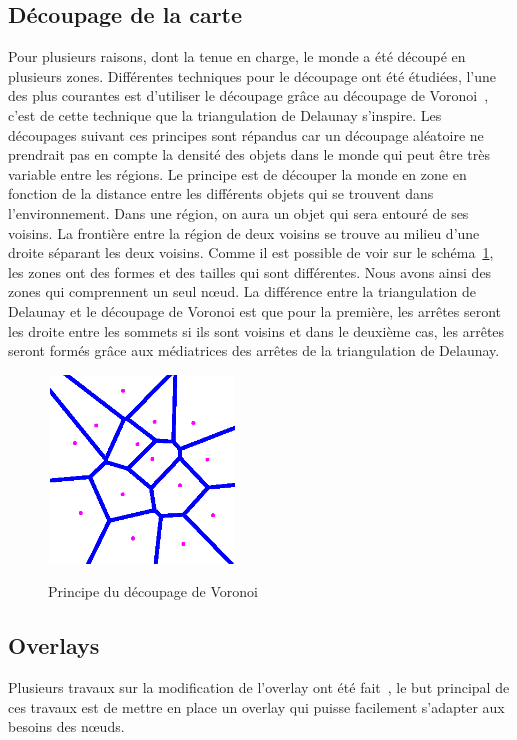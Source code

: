 	\subsection{Découpage de la carte}
	Pour plusieurs raisons, dont la tenue en charge, le monde a été découpé en plusieurs zones. Différentes techniques pour le découpage ont été étudiées, l'une des plus courantes est d'utiliser le découpage grâce au découpage de Voronoi~\cite{1016552}, c'est de cette technique que la triangulation de Delaunay s'inspire. Les découpages suivant ces principes sont répandus car un découpage aléatoire ne prendrait pas en compte la densité des objets dans le monde qui peut être très variable entre les régions. Le principe est de découper la monde en zone en fonction de la distance entre les différents objets qui se trouvent dans l'environnement. Dans une région, on aura un objet qui sera entouré de ses voisins. La frontière entre la région de deux voisins se trouve au milieu d'une droite séparant les deux voisins. Comme il est possible de voir sur le schéma~\ref{Voronoi}, les zones ont des formes et des tailles qui sont différentes. Nous avons ainsi des zones qui comprennent un seul nœud. La différence entre la triangulation de Delaunay et le découpage de Voronoi est que pour la première, les arrêtes seront les droite entre les sommets si ils sont voisins et dans le deuxième cas, les arrêtes seront formés grâce aux médiatrices des arrêtes de la triangulation de Delaunay.\\ 
	\vspace{5mm}
        \begin{figure}[!h]
        \centering
        \includegraphics[width=5cm,height=5cm]{../Images/voronoi.png}\\
        \caption{Principe du découpage de Voronoi}
        \label{Voronoi}
        \end{figure}
        \vspace{5mm}

	\subsection{Overlays}
	Plusieurs travaux sur la modification de l'overlay ont été fait~\cite{999375,10.1109/SRDS.2006.33,citeulike:6040284}, le but principal de ces travaux est de mettre en place un overlay qui puisse facilement s'adapter aux besoins des nœuds.
